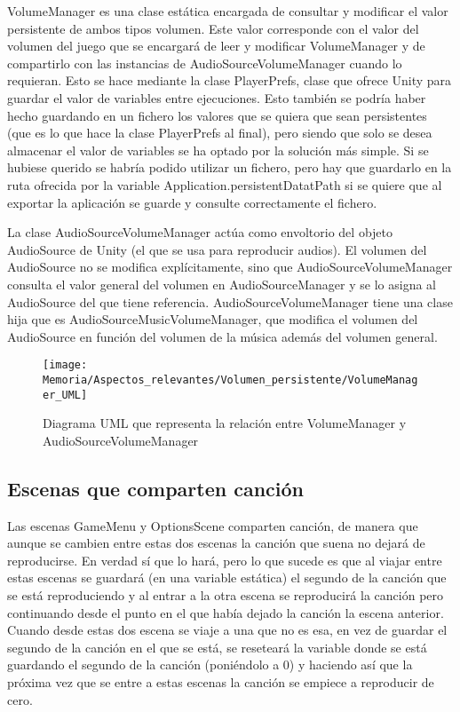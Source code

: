 VolumeManager es una clase estática encargada de consultar y modificar el valor persistente de ambos tipos volumen. Este valor corresponde con el valor del volumen del juego que se encargará de leer y modificar VolumeManager y de compartirlo con las instancias de AudioSourceVolumeManager cuando lo requieran. Esto se hace mediante la clase PlayerPrefs, clase que ofrece Unity para guardar el valor de variables entre ejecuciones. Esto también se podría haber hecho guardando en un fichero los valores que se quiera que sean persistentes (que es lo que hace la clase PlayerPrefs al final), pero siendo que solo se desea almacenar el valor de variables se ha optado por la solución más simple. Si se hubiese querido se habría podido utilizar un fichero, pero hay que guardarlo en la ruta ofrecida por la variable Application.persistentDatatPath si se quiere que al exportar la aplicación se guarde y consulte correctamente el fichero.

La clase AudioSourceVolumeManager actúa como envoltorio del objeto AudioSource de Unity (el que se usa para reproducir audios). El volumen del AudioSource no se modifica explícitamente, sino que AudioSourceVolumeManager consulta el valor general del volumen en AudioSourceManager y se lo asigna al AudioSource del que tiene referencia. AudioSourceVolumeManager tiene una clase hija que es AudioSourceMusicVolumeManager, que modifica el volumen del AudioSource en función del volumen de la música además del volumen general.

\begin{figure}[h]
\texttt{[image: Memoria/Aspectos\_relevantes/Volumen\_persistente/VolumeManager\_UML]}
\caption{Diagrama UML que representa la relación entre VolumeManager y AudioSourceVolumeManager}
\end{figure}

\subsection{Escenas que comparten canción}
Las escenas GameMenu y OptionsScene comparten canción, de manera que aunque se cambien entre estas dos escenas la canción que suena no dejará de reproducirse. En verdad sí que lo hará, pero lo que sucede es que al viajar entre estas escenas se guardará (en una variable estática) el segundo de la canción que se está reproduciendo y al entrar a la otra escena se reproducirá la canción pero continuando desde el punto en el que había dejado la canción la escena anterior. Cuando desde estas dos escena se viaje a una que no es esa, en vez de guardar el segundo de la canción en el que se está, se reseteará la variable donde se está guardando el segundo de la canción (poniéndolo a 0) y haciendo así que la próxima vez que se entre a estas escenas la canción se empiece a reproducir de cero.

